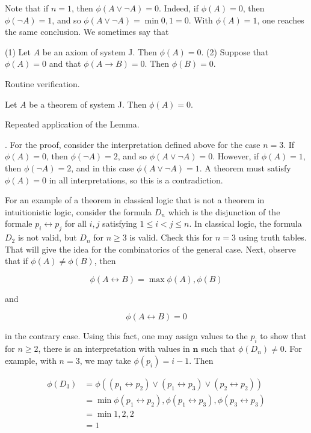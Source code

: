 Note that if $n = 1$, then $\phi(A \lor \neg A) = 0$.  Indeed, if $\phi(A) = 0$, then $\phi(\neg A) =1$, and so $\phi(A \lor \neg A) = \min 0, 1 = 0$.  With $\phi(A) = 1$, one reaches the same conclusion.  We sometimes say that 

\begin{lemma}
(1) Let $A$ be an axiom of system J. Then $\phi(A) = 0$. (2) Suppose that $\phi(A) = 0$ and that $\phi(A \to B) = 0$.  Then $\phi(B) = 0$.
\end{lemma}

  Routine verification.

\begin{theorem}
Let $A$ be a theorem of system J.  Then $\phi(A) = 0$.
\end{theorem}

  Repeated application of the Lemma. 



 . For the proof, consider the interpretation defined above for the case $n =3$.  If $\phi(A) = 0$, then $\phi(\neg A) = 2$, and so $\phi(A \lor \neg A) = 0$.  However, if $\phi(A) = 1$, then $\phi(\neg A) = 2$, and in this case  $\phi(A \lor \neg A) = 1$.  A theorem must satisfy $\phi(A) = 0$ in all interpretations, so this is a contradiction. 

For an example of a theorem in classical logic that is not a theorem in intuitionistic logic, consider the formula $D_n$ which is the disjunction of the formale $p_i \leftrightarrow p_j$ for all $i, j$ satisfying $1 \le i < j \le n$. In classical logic, the formula $D_2$ is not valid, but $D_n$ for $n \ge 3$ is valid.  Check this for $n = 3$ using truth tables. That will give the idea for the combinatorics of the general case. Next, observe that  if $\phi(A) \ne \phi(B)$,  then

$$
  \phi(A \leftrightarrow B) = \max \phi(A), \phi(B)
$$

and 

$$
  \phi(A \leftrightarrow B) = 0
$$

in the contrary case.  Using this fact, one may assign values to the $p_i$ to show that for $n  \ge 2$, there is an interpretation with values in $\mathbf{n}$ such that  $\phi(D_n) \ne 0$.  For example, with $n = 3$, we may take $\phi(p_i) = i-1$.
Then 

\begin{align}
\phi(D_3) &= \phi((p_1 \leftrightarrow p_2) \lor (p_1 \leftrightarrow p_3)\lor (p_2 \leftrightarrow p_2)) \\
  & = \min \phi(p_1 \leftrightarrow p_2), \phi(p_1 \leftrightarrow p_3), \phi(p_3 \leftrightarrow p_3) \\
  & = \min 1, 2, 2 \\
 & = 1 \\
\end{align}

